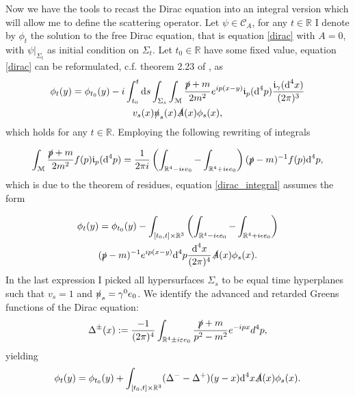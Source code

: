\documentclass[b5paper,draft,openbib,12pt]{memoir}
\begin{document}
Now we have the tools to recast the Dirac equation into an integral version
which will allow me to define the scattering operator. 
Let \(\psi \in \mathcal{C}_A\), for any \(t\in\mathbb{R}\) I denote by \(\phi_t\) the solution to the free Dirac equation, that is equation \eqref{dirac} with \(A=0\), with \(\left.\psi\right|_{\Sigma_t}\) as initial condition on \(\Sigma_t\). Let \(t_0\in\mathbb{R}\) have some fixed value, equation \eqref{dirac} can be reformulated, c.f. theorem 2.23 of \cite{deckert2014dirac}, as
\begin{multline}\label{dirac_integral}
\phi_t(y)=\phi_{t_0}(y)
-i \int_{t_0}^t \text{d}s \int_{\Sigma_s}\int_{\mathcal{M}}\frac{\slashed{p}+m}{2m^2}e^{ip(x-y)}\mathfrak{i}_p(\text{d}^4p) \frac{\mathfrak{i}_{\gamma}(\text{d}^4x)}{(2\pi)^{3}}\\
v_s(x)\slashed{n}_s(x) \slashed{A}(x)\phi_s(x),
\end{multline}
which holds for any \(t\in\mathbb{R}\). Employing the following rewriting of integrals

\begin{equation}
\int_{\mathcal{M}}\frac{\slashed{p}+m}{2 m^2} f(p) \mathfrak{i}_p(\text{d}^4p)=\frac{1}{2\pi i}   \left( \int_{\mathbb{R}^4-i \epsilon e_0}-\int_{\mathbb{R}^4+i \epsilon e_0} \right) (\slashed{p}-m)^{-1} f(p)  \text{d}^4p,
\end{equation}
which is due to the theorem of residues, equation \eqref{dirac_integral} assumes the form

\begin{multline}
\phi_t(y)=\phi_{t_0}(y)
- \int_{[t_0,t]\times\mathbb{R}^3}  \left( \int_{\mathbb{R}^4-i \epsilon e_0}-\int_{\mathbb{R}^4+i \epsilon e_0} \right)\\
 (\slashed{p}-m)^{-1} e^{ip(x-y)}  \text{d}^4p  \frac{\text{d}^4x}{(2\pi)^{4}}\slashed{A}(x)\phi_s(x). 
\end{multline} 
In the last expression I picked all hypersurfaces \(\Sigma_s\) to be equal time
hyperplanes such that \(v_s=1\) and \(\slashed{n}_s=\gamma^0 e_0\). We identify
the advanced and retarded Greens functions of the Dirac equation:
\begin{equation}
\Delta^\pm (x):= \frac{-1}{(2\pi)^4} \int_{\mathbb{R}^4\pm i \varepsilon e_0} \frac{\slashed{p}+ m}{p^2-m^2} e^{-ipx} d^4 p,
\end{equation}
yielding
\begin{multline}\label{dirac integral split}
\phi_t(y)=\phi_{t_0}(y)
+ \int_{[t_0,t]\times\mathbb{R}^3}  (\Delta^--\Delta^+)(y-x)  \text{d}^4x \slashed{A}(x)\phi_s(x). 
\end{multline} 
\end{document}
